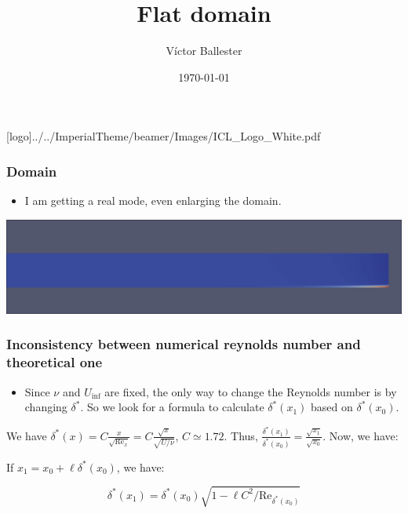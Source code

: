 \documentclass[
  aspectratio=169, %
  t, %
  onlytextwidth, %
  10pt, %
]{beamer}
\title{Flat domain} %
\subtitle{} %
\author{Víctor Ballester} %
\date{\today} %
\def\imagefolder{../../ImperialTheme/beamer/Images}
\def\Rey{\text{Re}}
\begin{document}
\begingroup
{} %
[logo]{\imagefolder/ICL_Logo_White.pdf} %
\frame[plain, s]{\titlepage} %
\endgroup

\begin{frame}
	\frametitle{Domain}
	\begin{itemize}
		\item I am getting a real mode, even enlarging the domain.
	\end{itemize}
	{
	\centering
	\includegraphics[width=1\textwidth]{Images/emode.png}
	}
\end{frame}
\begin{frame}
	\frametitle{Inconsistency between numerical reynolds number and theoretical one}
	\begin{itemize}
		\item Since $\nu$ and $U_\text{inf}$ are fixed, the only way to change the Reynolds number is by changing $\delta^*$. So we look for a formula to calculate $\delta^*(x_1)$ based on $\delta^*(x_0)$.
	\end{itemize}
	We have $\delta^*(x)=C\frac{x}{\sqrt{\Rey_x}}=C\frac{\sqrt{x}}{\sqrt{U/\nu}}$, $C\simeq 1.72$. Thus, $\frac{\delta^*(x_1)}{\delta^*(x_0)}=\frac{\sqrt{x_1}}{\sqrt{x_0}}$.
	Now, we have:

	If $x_1 = x_0 + \ell \delta^*(x_0)$, we have:

	$$
	  \delta^*(x_1) = \delta^*(x_0) \sqrt{1-\ell C^2/\Rey_{\delta^*(x_0)}}
	$$
\end{frame}
\end{document}
